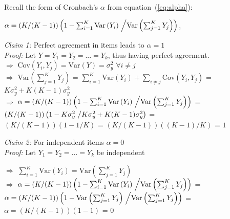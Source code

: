\documentclass{article}\usepackage[]{graphicx}\usepackage[]{color}
\newcommand{\km}[1]{{\color{Orange} #1}}
\newcommand{\V}[1]{\text{Var}\left(#1\right)}
\begin{document}
\km{

Recall the form of Cronbach's $\alpha$ from equation~(\ref{eq:alpha}):\\

\begin{center}
$\alpha = \left(K/(K-1)\right) \left( 1- \sum_{i=1}^K \V{Y_i} \right.\left/  \V{\sum_{j=1}^K Y_j}  \right)$,
\end{center}


\textit{Claim 1:} Perfect agreement in items leads to $\alpha = 1$ \\

\textit{Proof:} Let $ Y = Y_1 = Y_2 = ... = Y_k$, thus having perfect agreement.\\

$\Rightarrow$  $\text{Cov}(Y_i, Y_j) = \V{Y} = \sigma^2_y $ \hspace{.1in} $\forall i\ne j$ \\

$\Rightarrow$  $\V{\sum_{j=1}^K Y_j }$ = $\sum_{i=1}^K \V{Y_i} + \sum_{i\ne j}\text{Cov}(Y_i, Y_j)$ =  $K\sigma^2_y + K(K-1)\sigma^2_y$ \\

$\Rightarrow$  $\alpha = \left(K/(K-1)\right) \left( 1- \sum_{i=1}^K \V{Y_i} \right.\left/  \V{\sum_{j=1}^K Y_j}  \right)$ = \\
\indent \hspace{.2in} $\left(K/(K-1)\right) \left( 1- K\sigma^2_y \right.\left/ K\sigma^2_y + K(K-1)\sigma^2_y \right)$ =\\
\indent \hspace{.2in} $\left(K/(K-1)\right)  (1- 1/K)$ = $\left(K/(K-1)\right) ((K-1)/K)$ = $1$ \\

\vspace{.25in} %

\textit{Claim 2:} For independent items $\alpha = 0$ \\

\textit{Proof:} Let $Y_1 = Y_2 = ... = Y_k$ be independent 

$\Rightarrow$ $\sum_{i=1}^K \V{Y_i} = \V{\sum_{j=1}^K Y_j} $ \\

$\Rightarrow$  $\alpha = \left(K/(K-1)\right) \left( 1- \sum_{i=1}^K \V{Y_i} \right.\left/  \V{\sum_{j=1}^K Y_j}  \right)$ = \\
\indent \hspace{.2in} $\alpha = \left(K/(K-1)\right) \left( 1- \V{\sum_{j=1}^K Y_j} \right.\left/  \V{\sum_{j=1}^K Y_j}  \right)$ = \\
\indent \hspace{.2in} $\alpha = \left(K/(K-1)\right) \left( 1- 1 \right)$ = 0 \\

}
\end{document}
